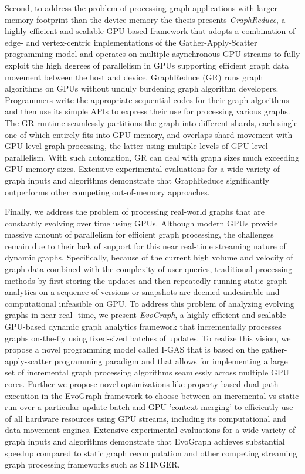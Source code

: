 Second, to address the problem of processing graph applications with larger memory footprint than the device memory the thesis presents \textit{GraphReduce}, a highly efficient and scalable GPU-based framework that adopts a combination of edge- and vertex-centric implementations of the Gather-Apply-Scatter programming model and operates on multiple asynchronous GPU streams to fully exploit the high degrees of parallelism in GPUs supporting efficient graph data movement between the host and device. GraphReduce (GR) runs graph algorithms on GPUs without unduly burdening graph algorithm developers. Programmers write the appropriate sequential codes for their graph algorithms and then use its simple APIs to express their use for processing various graphs. The GR runtime seamlessly partitions the graph into different shards, each single one of which entirely fits into GPU memory, and overlaps shard movement with GPU-level graph processing, the latter using multiple levels of GPU-level parallelism. With such automation, GR can deal with graph sizes much exceeding GPU memory sizes. Extensive experimental evaluations for a wide variety of graph inputs and algorithms demonstrate that GraphReduce significantly outperforms other competing out-of-memory approaches.


Finally, we address the problem of processing real-world graphs that are constantly evolving over time using GPUs. Although modern GPUs provide massive amount of parallelism for efficient graph processing, the challenges remain due to their lack of support for this near real-time streaming nature of dynamic graphs. Specifically, because of the current high volume and velocity of graph data combined with the complexity of user queries, traditional processing methods by first storing the updates and then repeatedly running static graph analytics on a sequence of versions or snapshots are deemed undesirable and computational infeasible on GPU. To address this problem of analyzing evolving graphs in near real- time, we present \textit{EvoGraph}, a highly efficient and scalable GPU-based dynamic graph analytics framework that incrementally processes graphs on-the-fly using fixed-sized batches of updates. To realize this vision, we propose a novel programming model called I-GAS that is based on the gather-apply-scatter programming paradigm and that allows for implementing a large set of incremental graph processing algorithms seamlessly across multiple GPU cores. Further we propose novel optimizations like property-based dual path execution in the EvoGraph framework to choose between an incremental vs static run over a particular update batch and GPU 'context merging' to efficiently use of all hardware resources using GPU streams, including its computational and data movement engines. Extensive experimental evaluations for a wide variety of graph inputs and algorithms demonstrate that EvoGraph achieves substantial speedup compared to static graph recomputation and other competing streaming graph processing frameworks such as STINGER.
